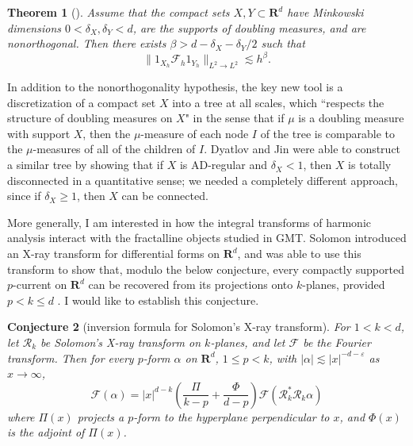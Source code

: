 \documentclass[reqno,11pt]{amsart}
\newcommand{\RR}{\mathbf{R}}
\newtheorem{theorem}{Theorem}[section]
\newtheorem{conjecture}[theorem]{Conjecture}
\theoremstyle{definition}
\numberwithin{equation}{section}
\begin{document}
\begin{theorem}[{\cite{backus2023fractal}}]
Assume that the compact sets $X, Y \subset \RR^d$ have Minkowski dimensions $0 < \delta_X, \delta_Y < d$, are the supports of doubling measures, and are nonorthogonal.
Then there exists $\beta > d - \delta_X - \delta_Y/2$ such that 
$$\|1_{X_h} \mathscr F_h 1_{Y_h}\|_{L^2 \to L^2} \lesssim h^\beta.$$
\end{theorem}

In addition to the nonorthogonality hypothesis, the key new tool is a discretization of a compact set $X$ into a tree at all scales, which ``respects the structure of doubling measures on $X$" in the sense that if $\mu$ is a doubling measure with support $X$, then the $\mu$-measure of each node $I$ of the tree is comparable to the $\mu$-measures of all of the children of $I$.
Dyatlov and Jin were able to construct a similar tree by showing that if $X$ is AD-regular and $\delta_X < 1$, then $X$ is totally disconnected in a quantitative sense; we needed a completely different approach, since if $\delta_X \geq 1$, then $X$ can be connected. 

More generally, I am interested in how the integral transforms of harmonic analysis interact with the fractalline objects studied in GMT. 
Solomon introduced an X-ray transform for differential forms on $\RR^d$, and was able to use this transform to show that, modulo the below conjecture, every compactly supported $p$-current on $\RR^d$ can be recovered from its projections onto $k$-planes, provided $p < k \leq d$ \cite{Solomon11}.
I would like to establish this conjecture.

\begin{conjecture}[inversion formula for Solomon's X-ray transform]
For $1 < k < d$, let $\mathcal R_k$ be Solomon's X-ray transform on $k$-planes, and let $\mathscr F$ be the Fourier transform.
Then for every $p$-form $\alpha$ on $\RR^d$, $1 \leq p < k$, with $|\alpha| \lesssim |x|^{-d-\varepsilon}$ as $x \to \infty$,
$$\mathscr F(\alpha) = |x|^{d - k} \left(\frac{\Pi}{k - p} + \frac{\Phi}{d - p}\right) \mathscr F(\mathcal R_k^* \mathcal R_k \alpha)$$
where $\Pi(x)$ projects a $p$-form to the hyperplane perpendicular to $x$, and $\Phi(x)$ is the adjoint of $\Pi(x)$.
\end{conjecture}

\printbibliography
\end{document}
